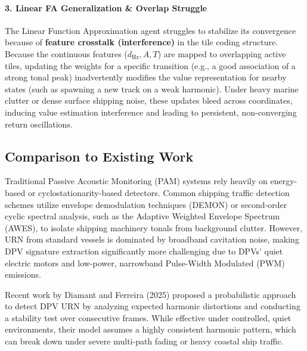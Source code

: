 \documentclass[12pt,a4paper]{article}
\begin{document}
\paragraph{3. Linear FA Generalization \& Overlap Struggle}
The Linear Function Approximation agent struggles to stabilize its convergence because of \textbf{feature crosstalk (interference)} in the tile coding structure. Because the continuous features ($d_{\text{Hz}}, A, T$) are mapped to overlapping active tiles, updating the weights for a specific transition (e.g., a good association of a strong tonal peak) inadvertently modifies the value representation for nearby states (such as spawning a new track on a weak harmonic). Under heavy marine clutter or dense surface shipping noise, these updates bleed across coordinates, inducing value estimation interference and leading to persistent, non-converging return oscillations.

\subsection{Comparison to Existing Work}
Traditional Passive Acoustic Monitoring (PAM) systems rely heavily on energy-based or cyclostationarity-based detectors. Common shipping traffic detection schemes utilize envelope demodulation techniques (DEMON) or second-order cyclic spectral analysis, such as the Adaptive Weighted Envelope Spectrum (AWES), to isolate shipping machinery tonals from background clutter. However, URN from standard vessels is dominated by broadband cavitation noise, making DPV signature extraction significantly more challenging due to DPVs' quiet electric motors and low-power, narrowband Pulse-Width Modulated (PWM) emissions.

Recent work by Diamant and Ferreira (2025) proposed a probabilistic approach to detect DPV URN by analyzing expected harmonic distortions and conducting a stability test over consecutive frames. While effective under controlled, quiet environments, their model assumes a highly consistent harmonic pattern, which can break down under severe multi-path fading or heavy coastal ship traffic. 
\end{document}
